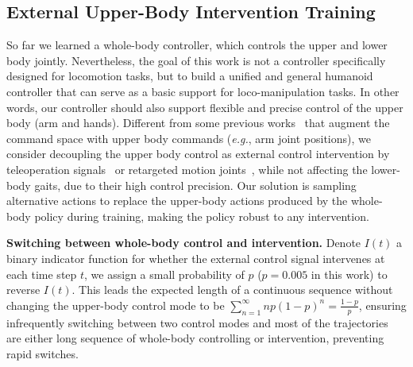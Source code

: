 

\subsection{External Upper-Body Intervention Training}
\label{sec:intervention}
So far we learned a whole-body controller, which controls the upper and lower body jointly.
Nevertheless, the goal of this work is not a controller specifically designed for locomotion tasks, but to build a unified and general humanoid controller that can serve as a basic support for loco-manipulation tasks. In other words, our controller should also support flexible and precise control of the upper body (arm and hands). Different from some previous works~\citep{he2024omnih2o,he2024hover} that augment the command space with upper body commands (\textit{e.g.}, arm joint positions), we consider decoupling the upper body control as external control intervention by teleoperation signals~\citep{cheng2024tv,lu2024pmp} or retargeted motion joints~\citep{cheng2024expressive,2024exbody2}, while not affecting the lower-body gaits, due to their high control precision.
Our solution is sampling alternative actions to replace the upper-body actions produced by the whole-body policy during training, making the policy robust to any intervention.

\noindent\textbf{Switching between whole-body control and intervention.}
Denote $I(t)$ a binary indicator function for whether the external control signal intervenes at each time step $t$, we assign a small probability of $p$ ($p=0.005$ in this work) to reverse $I(t)$.
This leads the expected length of a continuous sequence without changing the upper-body control mode to be $\sum_{n=1}^{\infty}np(1-p)^n=\frac{1-p}{p}$,
ensuring infrequently switching between two control modes and most of the trajectories are either long sequence of whole-body controlling or intervention, preventing rapid switches.

